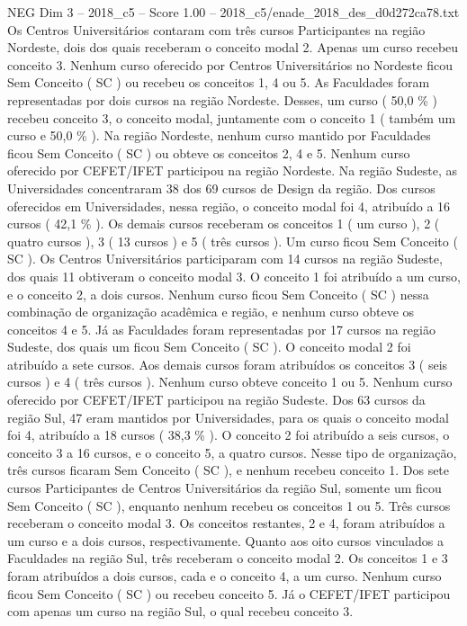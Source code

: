 \begin{textsample}{NEG Dim 3 – 2018\_c5 – Score 1.00 – 2018\_c5/enade\_2018\_des\_d0d272ca78.txt}
Os Centros Universitários contaram com três cursos Participantes na região Nordeste, dois dos quais receberam o conceito modal 2.
Apenas um curso recebeu conceito 3.
Nenhum curso oferecido por Centros Universitários no Nordeste ficou Sem Conceito ( SC ) ou recebeu os conceitos 1, 4 ou 5.
As Faculdades foram representadas por dois cursos na região Nordeste.
Desses, um curso ( 50,0 \% ) recebeu conceito 3, o conceito modal, juntamente com o conceito 1 ( também um curso e 50,0 \% ).
Na região Nordeste, nenhum curso mantido por Faculdades ficou Sem Conceito ( SC ) ou obteve os conceitos 2, 4 e 5.
Nenhum curso oferecido por CEFET/IFET participou na região Nordeste.
Na região Sudeste, as Universidades concentraram 38 dos 69 cursos de Design da região.
Dos cursos oferecidos em Universidades, nessa região, o conceito modal foi 4, atribuído a 16 cursos ( 42,1 \% ).
Os demais cursos receberam os conceitos 1 ( um curso ), 2 ( quatro cursos ), 3 ( 13 cursos ) e 5 ( três cursos ).
Um curso ficou Sem Conceito ( SC ).
Os Centros Universitários participaram com 14 cursos na região Sudeste, dos quais 11 obtiveram o conceito modal 3.
O conceito 1 foi atribuído a um curso, e o conceito 2, a dois cursos.
Nenhum curso ficou Sem Conceito ( SC ) nessa combinação de organização acadêmica e região, e nenhum curso obteve os conceitos 4 e 5.
Já as Faculdades foram representadas por 17 cursos na região Sudeste, dos quais um ficou Sem Conceito ( SC ).
O conceito modal 2 foi atribuído a sete cursos.
Aos demais cursos foram atribuídos os conceitos 3 ( seis cursos ) e 4 ( três cursos ).
Nenhum curso obteve conceito 1 ou 5.
Nenhum curso oferecido por CEFET/IFET participou na região Sudeste.
Dos 63 cursos da região Sul, 47 eram mantidos por Universidades, para os quais o conceito modal foi 4, atribuído a 18 cursos ( 38,3 \% ).
O conceito 2 foi atribuído a seis cursos, o conceito 3 a 16 cursos, e o conceito 5, a quatro cursos.
Nesse tipo de organização, três cursos ficaram Sem Conceito ( SC ), e nenhum recebeu conceito 1.
Dos sete cursos Participantes de Centros Universitários da região Sul, somente um ficou Sem Conceito ( SC ), enquanto nenhum recebeu os conceitos 1 ou 5.
Três cursos receberam o conceito modal 3.
Os conceitos restantes, 2 e 4, foram atribuídos a um curso e a dois cursos, respectivamente.
Quanto aos oito cursos vinculados a Faculdades na região Sul, três receberam o conceito modal 2.
Os conceitos 1 e 3 foram atribuídos a dois cursos, cada e o conceito 4, a um curso.
Nenhum curso ficou Sem Conceito ( SC ) ou recebeu conceito 5.
Já o CEFET/IFET participou com apenas um curso na região Sul, o qual recebeu conceito 3.

\end{textsample}

